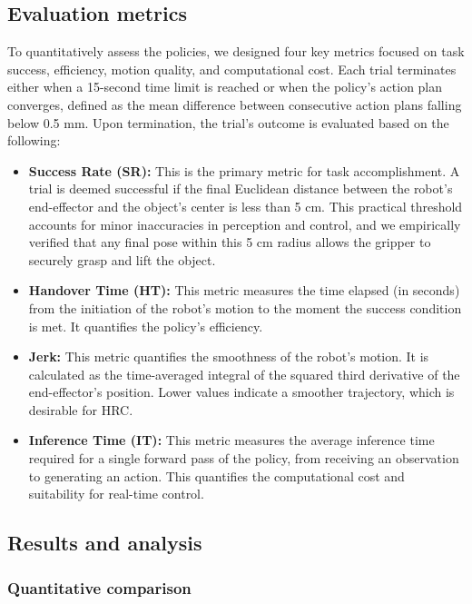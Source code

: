 \documentclass[final,5p,times,twocolumn]{elsarticle}
\begin{document}
\subsection{Evaluation metrics} \label{metrics}


To quantitatively assess the policies, we designed four key metrics focused on task success, efficiency, motion quality, and computational cost. Each trial terminates either when a 15-second time limit is reached or when the policy’s action plan converges, defined as the mean difference between consecutive action plans falling below 0.5 mm. Upon termination, the trial's outcome is evaluated based on the following:
\begin{itemize}
\item \textbf{Success Rate (SR):} This is the primary metric for task accomplishment. A trial is deemed successful if the final Euclidean distance between the robot's end-effector and the object's center is less than 5 cm. This practical threshold accounts for minor inaccuracies in perception and control, and we empirically verified that any final pose within this 5 cm radius allows the gripper to securely grasp and lift the object.


\item \textbf{Handover Time (HT):} This metric measures the time elapsed (in seconds) from the initiation of the robot's motion to the moment the success condition is met. It quantifies the policy's efficiency.
\item \textbf{Jerk:} This metric quantifies the smoothness of the robot's motion. It is calculated as the time-averaged integral of the squared third derivative of the end-effector's position. Lower values indicate a smoother trajectory, which is desirable for HRC.
\item \textbf{Inference Time (IT):} This metric measures the average inference time required for a single forward pass of the policy, from receiving an observation to generating an action. This quantifies the computational cost and suitability for real-time control.
\end{itemize}



\subsection{Results and analysis}   \label{results}

\subsubsection{Quantitative comparison}
\end{document}
